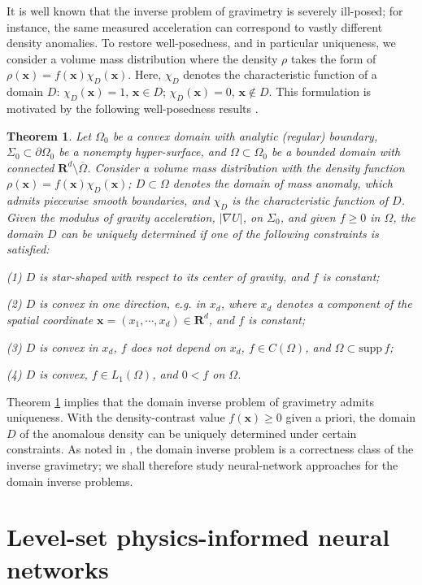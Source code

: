 \documentclass[final,hidelinks,onefignum,onetabnum]{siamart251216}
\newtheorem{thm}{Theorem}[section]
\begin{document}
It is well known that the inverse problem of gravimetry is severely ill-posed; for instance, the same measured acceleration can correspond to vastly different density anomalies. To restore well-posedness, and in particular uniqueness, we consider a volume mass distribution where the density $\rho$ takes the form of $\rho(\mathbf{x})=f(\mathbf{x})\chi_D(\mathbf{x})$. Here, $\chi_D$ denotes the characteristic function of a domain $D$: $\chi_D(\mathbf{x})=1$, $\mathbf{x}\in D$; $\chi_D(\mathbf{x})=0$, $\mathbf{x}\notin D$. This formulation is motivated by the following well-posedness results \cite{isa90, liqia21,denzhalima25}.
\begin{thm}\label{thm1}
Let $\Omega_0$ be a convex domain with analytic (regular) boundary, $\Sigma_0\subset\partial\Omega_0$  be a nonempty hyper-surface, and $\Omega\subset\Omega_0$ be a bounded domain with connected $\mathbf{R}^d\setminus\overline{\Omega}$. 
Consider a volume mass distribution with the density function $\rho(\mathbf{x})=f(\mathbf{x})\chi_D(\mathbf{x})$; $D\subset\Omega$ denotes the domain of mass anomaly, which admits piecewise smooth boundaries, and $\chi_D$ is the characteristic function of $D$. Given the modulus of gravity acceleration, $|\nabla U|$, on $\Sigma_0$, and given $f\ge0$ in $\Omega$, the domain $D$ can be uniquely determined if one of the following constraints is satisfied:

(1) $D$ is star-shaped with respect to its center of gravity, and $f$ is constant;

(2) $D$ is convex in one direction, e.g. in $x_d$, where $x_d$ denotes a component of the spatial coordinate $\mathbf{x}=(x_1,\cdots,x_d)\in\mathbf{R}^d$, and $f$ is constant;

(3) $D$ is convex in $x_d$, $f$ does not depend on $x_d$, $f\in C(\Omega)$, and $\Omega\subset \mathrm{supp}\,f$;

(4) $D$ is convex, $f\in L_1(\Omega)$, and $0<f$ on $\Omega$.
\end{thm}

Theorem \ref{thm1} implies that the domain inverse problem of gravimetry admits uniqueness. With the density-contrast value $f(\mathbf{x})\ge0$ given a priori, the domain $D$ of the anomalous density can be uniquely determined under certain constraints. As noted in \cite{cheli24}, the domain inverse problem is a correctness class of the inverse gravimetry; we shall therefore study neural-network approaches for the domain inverse problems.

\section{Level-set physics-informed neural networks} \label{sec3}
\end{document}
